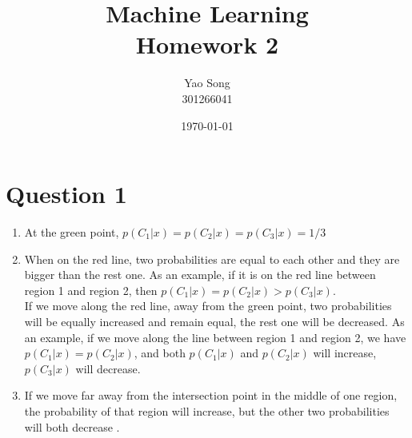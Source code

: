 \documentclass[paper=a4, fontsize=15pt]{article} %
\title{	
Machine Learning \\
Homework 2
}
\author{Yao Song\\301266041} %
\date{\normalsize\today} %
\begin{document}
\maketitle %

\section*{Question 1}
\begin{enumerate}
  \item At the green point, $p(C_1|x) = p(C_2|x) = p(C_3|x) = 1/3$
  \item When on the red line, two probabilities are equal to each other and they are bigger than the rest one.
        As an example, if it is on the red line between region 1 and region 2, then $p(C_1|x) = p(C_2|x) > p(C_3|x)$.\\
        If we move along the red line, away from the green point, two probabilities will be equally increased and remain equal, the rest one will be decreased.
        As an example, if we move along the line between region 1 and region 2, we have $p(C_1|x) = p(C_2|x)$, and both $p(C_1|x)$ and $p(C_2|x)$ will increase, $p(C_3|x)$ will decrease.
        
  \item If we move far away from the intersection point in the middle of one region, the probability of that region will increase, but the other two probabilities will both decrease .
\end{enumerate}
\end{document}
